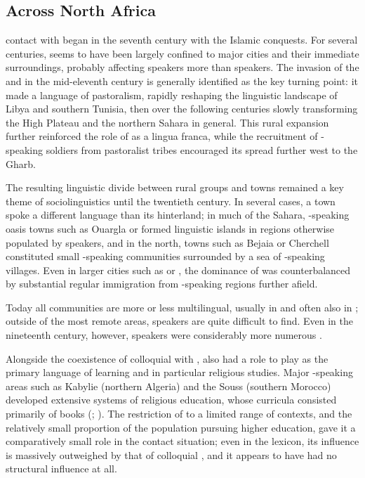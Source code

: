 \documentclass[output=paper]{langsci/langscibook}
\begin{document}
 \subsection{Across North Africa} \label{na}


 contact with  began in the seventh century with the Islamic conquests. For several centuries,  seems to have been largely confined to major cities and their immediate surroundings, probably affecting  speakers more than  speakers. The invasion of the  and  in the mid-eleventh century is generally identified as the key turning point: it made  a language of pastoralism, rapidly reshaping the linguistic landscape of Libya and southern Tunisia, then over the following centuries slowly transforming the High Plateau and the northern Sahara in general.  This rural expansion further reinforced the role of  as a lingua franca, while the recruitment of -speaking soldiers from pastoralist tribes encouraged its spread further west to the  Gharb.

The resulting linguistic divide between rural groups and towns remained a key theme of  sociolinguistics until the twentieth century. In several cases, a town spoke a different language than its hinterland; in much of the Sahara, -speaking oasis towns such as Ouargla or  formed linguistic islands in regions otherwise populated by  speakers, and in the north, towns such as Bejaia or Cherchell constituted small -speaking communities surrounded by a sea of -speaking villages. Even in larger cities such as  or , the dominance of  was counterbalanced by substantial regular immigration from -speaking regions further afield.

Today all  communities are more or less multilingual, usually in  and often also in ; outside of the most remote areas,  speakers are quite difficult to find. Even in the nineteenth century, however,   speakers were considerably more numerous \citep[41]{Kossmann2013book}.

Alongside the coexistence of colloquial   with ,   also had a role to play as the primary language of learning and in particular religious studies.  Major -speaking areas such as Kabylie (northern Algeria) and the Souss (southern Morocco) developed extensive systems of religious education, whose curricula consisted primarily of  books (\citealt{Boogert1997}; \citealt{Mechehed2007}). The restriction of   to a limited range of contexts, and the relatively small proportion of the population pursuing higher education, gave it a comparatively small role in the contact situation; even in the lexicon, its influence is massively outweighed by that of colloquial , and it appears to have had no structural influence at all.
\end{document}
